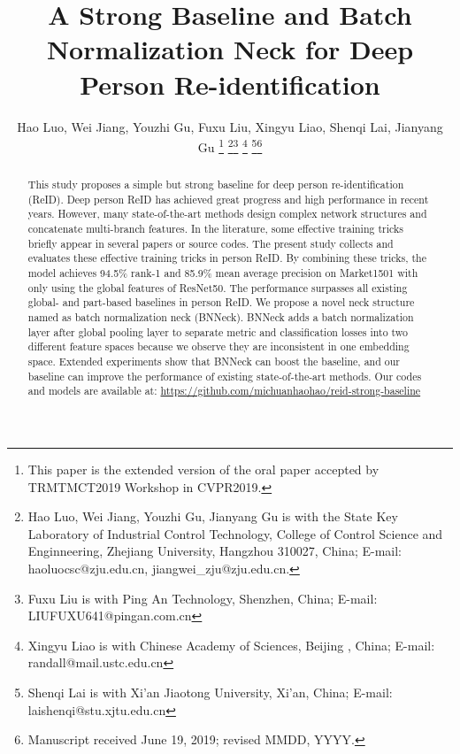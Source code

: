 \documentclass[journal]{IEEEtran}
\begin{document}
\title{A Strong Baseline and Batch Normalization Neck for Deep Person Re-identification}

\author{Hao Luo,
        Wei Jiang,
        Youzhi Gu,
        Fuxu Liu,
        Xingyu Liao,
        Shenqi Lai,
        Jianyang Gu
\thanks{This paper is the extended version of the oral paper \cite{luo2019bags} accepted by TRMTMCT2019 Workshop in CVPR2019.}
\thanks{Hao Luo, Wei Jiang, Youzhi Gu, Jianyang Gu is with the State Key Laboratory of Industrial Control Technology, College of Control Science and Enginneering, Zhejiang University, Hangzhou 310027, China; E-mail: haoluocsc@zju.edu.cn, jiangwei\_zju@zju.edu.cn.}\thanks{Fuxu Liu is with Ping An Technology, Shenzhen, China; E-mail: LIUFUXU641@pingan.com.cn}
\thanks{Xingyu Liao is with Chinese Academy of Sciences, Beijing , China; E-mail: randall@mail.ustc.edu.cn}
\thanks{Shenqi Lai is with Xi'an Jiaotong University, Xi'an, China; E-mail: laishenqi@stu.xjtu.edu.cn}\thanks{Manuscript received June 19, 2019; revised MMDD, YYYY.}}

\maketitle

\begin{abstract}
This study proposes a simple but strong baseline for deep person re-identification (ReID).
Deep person ReID has achieved great progress and high performance in recent years.
However, many state-of-the-art methods design complex network structures and concatenate multi-branch features.
In the literature, some effective training tricks briefly appear in several papers or source codes.
The present study collects and evaluates these effective training tricks in person ReID.
By combining these tricks, the model achieves 94.5\% rank-1 and 85.9\% mean average precision on Market1501 with only using the global features of ResNet50.
The performance surpasses all existing global- and part-based baselines in person ReID. We propose a novel neck structure named as batch normalization neck (BNNeck).
BNNeck adds a batch normalization layer after global pooling layer to separate metric and classification losses into two different feature spaces because we observe they are inconsistent in one embedding space.
Extended experiments show that BNNeck can boost the baseline, and our baseline can improve the performance of existing state-of-the-art methods.
Our codes and models are available at: \href{https://github.com/michuanhaohao/reid-strong-baseline}{https://github.com/michuanhaohao/reid-strong-baseline}
\end{abstract}
\end{document}

